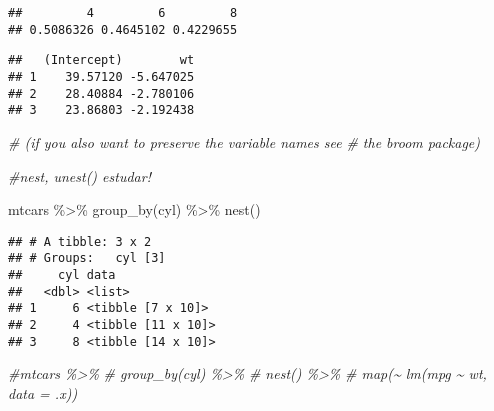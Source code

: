 \documentclass[
]{book}
\newenvironment{Shaded}{\begin{snugshade}}{\end{snugshade}}
\newcommand{\AttributeTok}[1]{\textcolor[rgb]{0.77,0.63,0.00}{#1}}
\newcommand{\CommentTok}[1]{\textcolor[rgb]{0.56,0.35,0.01}{\textit{#1}}}
\newcommand{\FunctionTok}[1]{\textcolor[rgb]{0.00,0.00,0.00}{#1}}
\newcommand{\NormalTok}[1]{#1}
\newcommand{\SpecialCharTok}[1]{\textcolor[rgb]{0.00,0.00,0.00}{#1}}
\begin{document}
\begin{verbatim}
##         4         6         8 
## 0.5086326 0.4645102 0.4229655
\end{verbatim}

\begin{Shaded}
\end{Shaded}

\begin{verbatim}
##   (Intercept)        wt
## 1    39.57120 -5.647025
## 2    28.40884 -2.780106
## 3    23.86803 -2.192438
\end{verbatim}

\begin{Shaded}
\begin{Highlighting}[]
\CommentTok{\# (if you also want to preserve the variable names see}
\CommentTok{\# the broom package)}


\CommentTok{\#nest, unest() estudar!}


\NormalTok{mtcars }\SpecialCharTok{\%\textgreater{}\%} 
  \FunctionTok{group\_by}\NormalTok{(cyl) }\SpecialCharTok{\%\textgreater{}\%} 
  \FunctionTok{nest}\NormalTok{()}
\end{Highlighting}
\end{Shaded}

\begin{verbatim}
## # A tibble: 3 x 2
## # Groups:   cyl [3]
##     cyl data              
##   <dbl> <list>            
## 1     6 <tibble [7 x 10]> 
## 2     4 <tibble [11 x 10]>
## 3     8 <tibble [14 x 10]>
\end{verbatim}

\begin{Shaded}
\begin{Highlighting}[]
\CommentTok{\#mtcars \%\textgreater{}\% }
\CommentTok{\#  group\_by(cyl) \%\textgreater{}\% }
\CommentTok{\#  nest() \%\textgreater{}\%}
\CommentTok{\#  map(\textasciitilde{} lm(mpg \textasciitilde{} wt, data = .x)) }
\end{Highlighting}
\end{Shaded}
\end{document}
